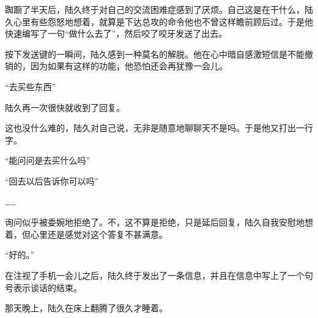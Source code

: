 踟蹰了半天后，陆久终于对自己的交流困难症感到了厌烦。自己这是在干什么，陆久心里有些怨怒地想着，就算是下达总攻的命令他也不曾这样瞻前顾后过。于是他快速编写了一句“做什么去了”，然后咬了咬牙发送了出去。

按下发送键的一瞬间，陆久感到一种莫名的解脱。他在心中暗自感激短信是不能撤销的，因为如果有这样的功能，他恐怕还会再犹豫一会儿。

“去买些东西”

陆久再一次很快就收到了回复。

这也没什么难的，陆久对自己说，无非是随意地聊聊天不是吗。于是他又打出一行字。

“能问问是去买什么吗”

“回去以后告诉你可以吗”

……

询问似乎被委婉地拒绝了。不，这不算是拒绝，只是延后回复，陆久自我安慰地想着，但心里还是感觉对这个答复不甚满意。

“好的。”

在注视了手机一会儿之后，陆久终于发出了一条信息，并且在信息中写上了一个句号表示谈话的结束。

那天晚上，陆久在床上翻腾了很久才睡着。